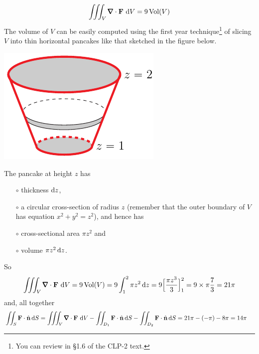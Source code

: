 \begin{eg}
\begin{align*}
\tripInt_V\vnabla\cdot\vF\ \dee{V}
=9\,\text{Vol}(V)
\end{align*}
The volume of $V$ can be easily computed using the first year 
technique\footnote{You can review in \S1.6 of the CLP-2 text.}
of slicing $V$ into thin horizontal pancakes like that sketched in the 
figure below.
\begin{nfig}
\begin{center}
    \includegraphics{coneC.pdf}
\end{center}
\end{nfig}
The pancake at height $z$ has 
\begin{itemize}\itemsep1pt \parskip0pt  %
\item[$\circ$] 
thickness $\mathrm{d}z$,
\item[$\circ$] 
a circular cross-section of radius $z$ (remember that the outer
boundary of $V$ has equation $x^2+y^2=z^2$), and hence has
\item[$\circ$] 
cross-sectional area $\pi z^2$ and
\item[$\circ$] 
volume $\pi z^2\,\mathrm{d}z$.
\end{itemize}
So
\begin{align*}
\tripInt_V\vnabla\cdot\vF\ \dee{V}
=9\,\text{Vol}(V)
=9\int_1^2 \pi z^2\,\dee{z}
=9\Big[\frac{\pi z^3}{3}\Big]_1^2
=9\times \pi\frac{7}{3}
=21\pi
\end{align*}
and, all together
\begin{align*}
\dblInt_S \vF\cdot\hn\,\dee{S}
&= \tripInt_V\vnabla\cdot\vF\ \dee{V} 
  -\dblInt_{D_1} \vF\cdot\hn\,\dee{S}
 -\dblInt_{D_2} \vF\cdot\hn\,\dee{S}
= 21\pi - (-\pi) -8\pi
=14\pi
\end{align*}



\end{eg}

